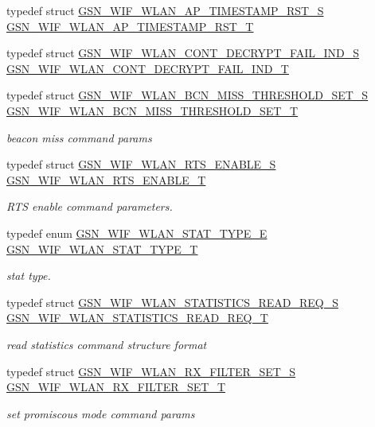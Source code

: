 \begin{DoxyCompactItemize}
\item 
typedef struct \hyperlink{a00369}{GSN\_\-WIF\_\-WLAN\_\-AP\_\-TIMESTAMP\_\-RST\_\-S} \hyperlink{a00677_ga45e197f3f0f8cc4176dbca34e5476b44}{GSN\_\-WIF\_\-WLAN\_\-AP\_\-TIMESTAMP\_\-RST\_\-T}
\item 
typedef struct \hyperlink{a00376}{GSN\_\-WIF\_\-WLAN\_\-CONT\_\-DECRYPT\_\-FAIL\_\-IND\_\-S} \hyperlink{a00677_gaf09a1811aabefafb86e8871fe79ddd6a}{GSN\_\-WIF\_\-WLAN\_\-CONT\_\-DECRYPT\_\-FAIL\_\-IND\_\-T}
\item 
typedef struct \hyperlink{a00372}{GSN\_\-WIF\_\-WLAN\_\-BCN\_\-MISS\_\-THRESHOLD\_\-SET\_\-S} \hyperlink{a00677_ga3804a62776c49cf6cd5522262eb81695}{GSN\_\-WIF\_\-WLAN\_\-BCN\_\-MISS\_\-THRESHOLD\_\-SET\_\-T}
\begin{DoxyCompactList}\small\item\em beacon miss command params \end{DoxyCompactList}\item 
typedef struct \hyperlink{a00396}{GSN\_\-WIF\_\-WLAN\_\-RTS\_\-ENABLE\_\-S} \hyperlink{a00677_ga7629340b77de2ac1d56c6aa8c8013d47}{GSN\_\-WIF\_\-WLAN\_\-RTS\_\-ENABLE\_\-T}
\begin{DoxyCompactList}\small\item\em RTS enable command parameters. \end{DoxyCompactList}\item 
typedef enum \hyperlink{a00677_ga1ea7ef2124a3ae886d909d6b8188ef79}{GSN\_\-WIF\_\-WLAN\_\-STAT\_\-TYPE\_\-E} \hyperlink{a00677_ga64d9749befbab903d13eae1c816e40cf}{GSN\_\-WIF\_\-WLAN\_\-STAT\_\-TYPE\_\-T}
\begin{DoxyCompactList}\small\item\em stat type. \end{DoxyCompactList}\item 
typedef struct \hyperlink{a00406}{GSN\_\-WIF\_\-WLAN\_\-STATISTICS\_\-READ\_\-REQ\_\-S} \hyperlink{a00677_ga0532c6cda31388631d8d6346390ac764}{GSN\_\-WIF\_\-WLAN\_\-STATISTICS\_\-READ\_\-REQ\_\-T}
\begin{DoxyCompactList}\small\item\em read statistics command structure format \end{DoxyCompactList}\item 
typedef struct \hyperlink{a00397}{GSN\_\-WIF\_\-WLAN\_\-RX\_\-FILTER\_\-SET\_\-S} \hyperlink{a00677_gad632a83292610148499e14031b507f4b}{GSN\_\-WIF\_\-WLAN\_\-RX\_\-FILTER\_\-SET\_\-T}
\begin{DoxyCompactList}\small\item\em set promiscous mode command params \end{DoxyCompactList}\item 

\end{DoxyCompactItemize}
